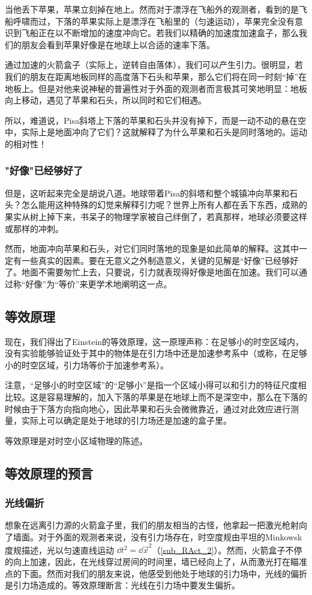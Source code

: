 当他丢下苹果，苹果立刻掉在地上。然而对于漂浮在飞船外的观测者，看到的是飞船呼啸而过，下落的苹果实际上是漂浮在飞船里的（匀速运动），苹果完全没有意识到飞船正在以不断增加的速度冲向它。若我们以精确的加速度加速盒子，那么我们的朋友会看到苹果好像是在地球上以合适的速率下落。

通过加速的火箭盒子（实际上，逆转自由落体），我们可以产生引力。很明显，若我们的朋友在距离地板同样的高度落下石头和苹果，那么它们将在同一时刻“掉”在地板上。但是对他来说神秘的普遍性对于外面的观测者而言极其可笑地明显：地板向上移动，遇见了苹果和石头，所以同时和它们相遇。

所以，难道说，Pisa斜塔上下落的苹果和石头并没有掉下，而是一动不动的悬在空中，实际上是地面冲向了它们？这就解释了为什么苹果和石头是同时落地的。运动的相对性！

\subsubsection{"好像"已经够好了}
但是，这听起来完全是胡说八道。地球带着Pisa的斜塔和整个城镇冲向苹果和石头？怎么能用这种特殊的幻觉来解释引力呢？世界上所有人都在丢下东西，成熟的果实从树上掉下来，书呆子的物理学家被自己绊倒了，若真那样，地球必须要这样或那样的冲刺。

然而，地面冲向苹果和石头，对它们同时落地的现象是如此简单的解释。这其中一定有一些真实的因素。要在无意义之外制造意义，关键的见解是“好像”已经够好了。地面不需要匆忙上去，只要说，引力就表现得好像是地面在加速。我们可以通过称“好像”为“等价”来更学术地阐明这一点。


\subsection{等效原理}
现在，我们得出了Einstein的等效原理，这一原理声称：在足够小的时空区域内，没有实验能够验证处于其中的物体是在引力场中还是加速参考系中（或称，在足够小的时空区域，引力场等价于加速参考系）。

注意，“足够小的时空区域”的“足够小”是指一个区域小得可以和引力的特征尺度相比较。这是容易理解的，加入下落的苹果是在地球上而不是深空中，那么在下落的时候由于下落方向指向地心，因此苹果和石头会微微靠近，通过对此效应进行测量，实际上可以确定是处于地球的引力场还是加速的盒子里。

等效原理是对时空小区域物理的陈述。

\subsection{等效原理的预言}

\subsubsection{光线偏折}
想象在远离引力源的火箭盒子里，我们的朋友相当的古怪，他拿起一把激光枪射向了墙面。对于外面的观测者来说，没有引力场存在，时空度规由平坦的Minkowsk度规描述，光以匀速直线运动 $\dd t^2=\dd{\vec x}^2$（\autoref{sub_RAct_2}）。然而，火箭盒子不停的向上加速，因此，在光线穿过房间的时间里，墙已经向上了，从而激光打在瞄准点的下面。然而对我们的朋友来说，他感受到他处于地球的引力场中，光线的偏折是引力场造成的。等效原理断言：光线在引力场中要发生偏折。

